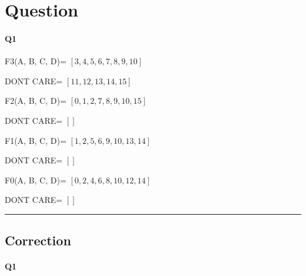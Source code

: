 
\section{Question}

\paragraph{Q1}


F3(A, B, C, D)= $[3, 4, 5, 6, 7, 8, 9, 10]$

DONT CARE= $[11, 12, 13, 14, 15]$

F2(A, B, C, D)= $[0, 1, 2, 7, 8, 9, 10, 15]$

DONT CARE= $[]$

F1(A, B, C, D)= $[1, 2, 5, 6, 9, 10, 13, 14]$

DONT CARE= $[]$

F0(A, B, C, D)= $[0, 2, 4, 6, 8, 10, 12, 14]$

DONT CARE= $[]$


\hrule width 1\linewidth\pagebreak
\subsection{Correction}

\paragraph{Q1}

